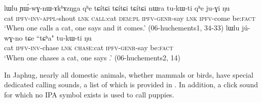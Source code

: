 \begin{exe}
\ex 
\begin{xlist}
\ex \label{ex:tCitCi3}
\gll lɯlu ɲɯ́-wɣ-nɯ-ɤkʰɤzŋga qʰe {tɕítɕi tɕítɕi tɕítɕi} nɯra tu-kɯ-ti qʰe ju-ɣi ŋu \\
cat \textsc{ipfv}-\textsc{inv}-\textsc{appl}-shout \textsc{lnk} \textsc{call}:cat \textsc{dem}:\textsc{pl} \textsc{ipfv}-\textsc{genr}-say \textsc{lnk} \textsc{ipfv}-come be:\textsc{fact} \\
\glt `When one calls a cat, one says  and it comes.' (06-huchements1, 34-33)
\ex \label{ex:tCha.lWlu}
\gll lɯlu jú-wɣ-no tɕe ``tɕʰa" tu-kɯ-ti ŋu \\
cat \textsc{ipfv}-\textsc{inv}-chase \textsc{lnk} \textsc{chase}:cat \textsc{ipfv}-\textsc{genr}-say be:\textsc{fact} \\
\glt `When one chases a cat, one says .' (06-huchements2, 14)
\end{xlist}
\end{exe}

In Japhug, nearly all domestic animals, whether mammals or birds, have special dedicated calling sounds, a list of which is provided in . In addition, a click sound for which no IPA symbol exists is used to call puppies.

